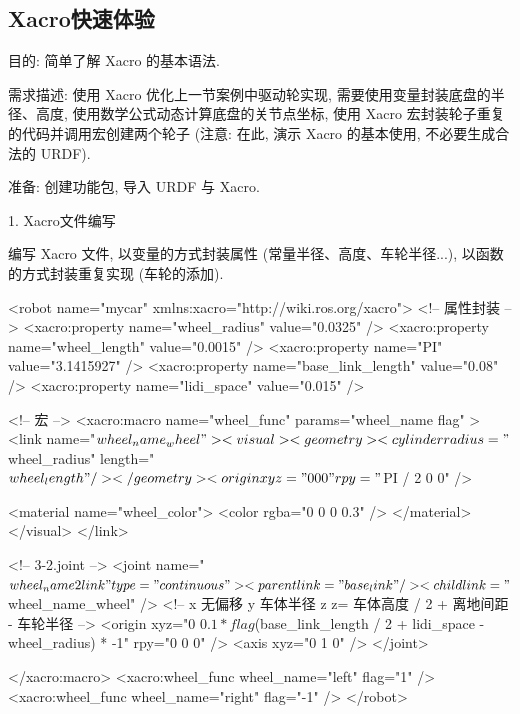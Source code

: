 \documentclass[openany, fontset=windowsold]{ctexbook}
\theoremstyle{kaiti}
\theoremstyle{normal}
\begin{document}
\subsection{Xacro快速体验}

目的: 简单了解 Xacro 的基本语法.

需求描述: 使用 Xacro 优化上一节案例中驱动轮实现, 需要使用变量封装底盘的半径、高度, 使用数学公式动态计算底盘的关节点坐标, 使用 Xacro 宏封装轮子重复的代码并调用宏创建两个轮子 (注意: 在此, 演示 Xacro 的基本使用, 不必要生成合法的 URDF).

准备: 创建功能包, 导入 URDF 与 Xacro.

1. Xacro文件编写

编写 Xacro 文件, 以变量的方式封装属性 (常量半径、高度、车轮半径...), 以函数的方式封装重复实现 (车轮的添加).

\begin{xml}
  <robot name="mycar" xmlns:xacro="http://wiki.ros.org/xacro">
      <!-- 属性封装 -->
      <xacro:property name="wheel_radius" value="0.0325" />
      <xacro:property name="wheel_length" value="0.0015" />
      <xacro:property name="PI" value="3.1415927" />
      <xacro:property name="base_link_length" value="0.08" />
      <xacro:property name="lidi_space" value="0.015" />

      <!-- 宏 -->
      <xacro:macro name="wheel_func" params="wheel_name flag" >
          <link name="${wheel_name}_wheel">
              <visual>
                  <geometry>
                      <cylinder radius="${wheel_radius}" length="${wheel_length}" />
                  </geometry>

                  <origin xyz="0 0 0" rpy="${PI / 2} 0 0" />

                  <material name="wheel_color">
                      <color rgba="0 0 0 0.3" />
                  </material>
              </visual>
          </link>

          <!-- 3-2.joint -->
          <joint name="${wheel_name}2link" type="continuous">
              <parent link="base_link"  />
              <child link="${wheel_name}_wheel" />
              <!-- 
                  x 无偏移
                  y 车体半径
                  z z= 车体高度 / 2 + 离地间距 - 车轮半径
              -->
              <origin xyz="0 ${0.1 * flag} ${(base_link_length / 2 + lidi_space - wheel_radius) * -1}" rpy="0 0 0" />
              <axis xyz="0 1 0" />
          </joint>

      </xacro:macro>
      <xacro:wheel_func wheel_name="left" flag="1" />
      <xacro:wheel_func wheel_name="right" flag="-1" />
  </robot>
\end{xml}
\end{document}
